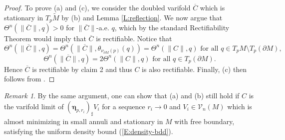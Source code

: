 \documentclass[10pt]{amsart}
\theoremstyle{definition}
\theoremstyle{remark}
\newtheorem{remark}[theorem]{Remark}
\numberwithin{equation}{section}
\newcommand{\V}{\mathcal{V}}
\newcommand{\lc}{\llcorner}
\newcommand{\bleta}{\boldsymbol \eta}
\newcommand{\tM}{\widetilde{M}}
\begin{document}
\begin{proof}
\vspace{0.3cm}
To prove (a) and (c), we consider the doubled varifold $\overline{C}$ which is stationary in $T_p\tM$ by (b) and Lemma \ref{L:reflection}. We now argue that $\Theta^n(\|\overline{C}\|,q)>0$ for $\|\overline{C}\|$-a.e. $q$, which by the standard Rectifiability Theorem \cite[42.4]{Simon} would imply that $\overline{C}$ is rectifiable. Notice that 
\[ \Theta^n(\|\overline{C}\|,q)=\Theta^n(\|\overline{C}\|,\theta_{\nu_{\partial M}(p)}(q))=\Theta^n(\|C\|,q) \text{ for all $q \in T_pM \setminus T_p(\partial M)$,} \]
\[ \Theta^n(\|\overline{C}\|,q)=2 \Theta^n(\|C\|,q) \text{ for all $q \in T_p(\partial M)$.} \]
Hence $\overline{C}$ is rectifiable by claim 2 and thus $C$ is also rectifiable. Finally, (c) then follows from \cite[Theorem 19.3]{Simon}.




\end{proof}


\begin{remark}
\label{R:tangent-cone}
By the same argument, one can show that (a) and (b) still hold if $C$ is the varifold limit of $(\bleta_{p,r_i})_\sharp V_i$ for a sequence $r_i \to 0$ and $V_i \in \V_n(M)$ which is almost minimizing in small annuli and stationary in $M$ with free boundary, satisfying the uniform density bound (\ref{E:density-bdd}).
\end{remark}
\end{document}
